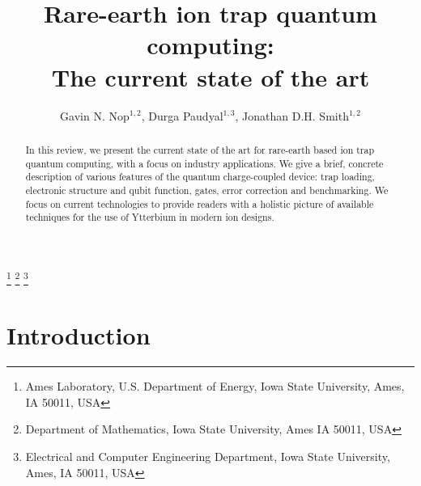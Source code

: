 \documentclass[12pt,a4paper]{amsart}
\numberwithin{equation}{section}
\theoremstyle{plain}
\theoremstyle{definition}
\begin{document}

\title[Rare-earth quantum computing]{Rare-earth ion trap quantum computing:\\ The current state of the art}


\author[Nop, Paudyal, Smith]{Gavin N. Nop$^{1, 2}$, Durga Paudyal$^{1,3}$, Jonathan D.H. Smith$^{1,2}$}









\begin{abstract} \small 
In this review, we present the current state of the art for rare-earth based ion trap quantum computing, with a focus on industry applications. We give a brief, concrete description of various features of the quantum charge-coupled device: trap loading, electronic structure and qubit function, gates, error correction and benchmarking. We focus on current technologies to provide readers with a holistic picture of available techniques for the use of Ytterbium in modern ion designs.
\end{abstract}


\maketitle
\footnote[1]{Ames Laboratory, U.S. Department of Energy, Iowa State University, Ames, IA 50011, USA}
\footnote[2]{Department of Mathematics, Iowa State University, Ames IA 50011, USA}
\footnote[3]{Electrical and Computer Engineering Department, Iowa State University, Ames, IA 50011, USA}
\tableofcontents


\newpage


\section{Introduction}
\end{document}
